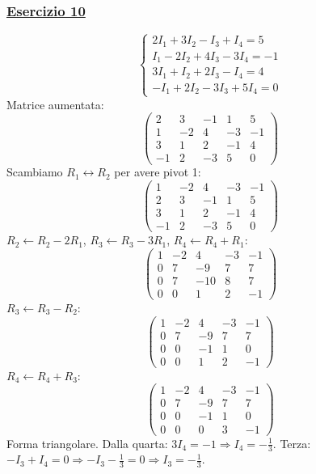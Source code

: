 \subsubsection*{\hyperref[ex:10]{Esercizio 10}}
\[
\begin{cases}
2I_1 + 3I_2 - I_3 + I_4 = 5 \\
I_1 - 2I_2 + 4I_3 - 3I_4 = -1 \\
3I_1 + I_2 + 2I_3 - I_4 = 4 \\
- I_1 + 2I_2 - 3I_3 + 5I_4 = 0
\end{cases}
\]
Matrice aumentata:
\[
\left(\begin{array}{cccc|c}
2 & 3 & -1 & 1 & 5 \\
1 & -2 & 4 & -3 & -1 \\
3 & 1 & 2 & -1 & 4 \\
-1 & 2 & -3 & 5 & 0
\end{array}\right)
\]
Scambiamo \(R_1 \leftrightarrow R_2\) per avere pivot 1:
\[
\left(\begin{array}{cccc|c}
1 & -2 & 4 & -3 & -1 \\
2 & 3 & -1 & 1 & 5 \\
3 & 1 & 2 & -1 & 4 \\
-1 & 2 & -3 & 5 & 0
\end{array}\right)
\]
\(R_2 \leftarrow R_2 - 2R_1\), \(R_3 \leftarrow R_3 - 3R_1\), \(R_4 \leftarrow R_4 + R_1\):
\[
\left(\begin{array}{cccc|c}
1 & -2 & 4 & -3 & -1 \\
0 & 7 & -9 & 7 & 7 \\
0 & 7 & -10 & 8 & 7 \\
0 & 0 & 1 & 2 & -1
\end{array}\right)
\]
\(R_3 \leftarrow R_3 - R_2\):
\[
\left(\begin{array}{cccc|c}
1 & -2 & 4 & -3 & -1 \\
0 & 7 & -9 & 7 & 7 \\
0 & 0 & -1 & 1 & 0 \\
0 & 0 & 1 & 2 & -1
\end{array}\right)
\]
\(R_4 \leftarrow R_4 + R_3\):
\[
\left(\begin{array}{cccc|c}
1 & -2 & 4 & -3 & -1 \\
0 & 7 & -9 & 7 & 7 \\
0 & 0 & -1 & 1 & 0 \\
0 & 0 & 0 & 3 & -1
\end{array}\right)
\]
Forma triangolare. Dalla quarta: \(3I_4 = -1 \Rightarrow I_4 = -\frac{1}{3}\).
Terza: \(-I_3 + I_4 = 0 \Rightarrow -I_3 - \frac{1}{3} = 0 \Rightarrow I_3 = -\frac{1}{3}\).
